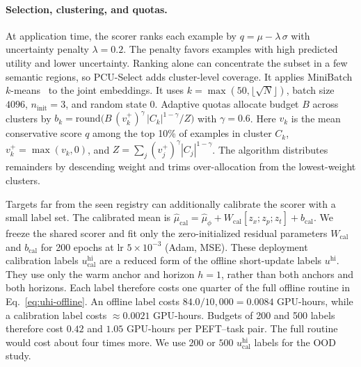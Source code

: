 \paragraph{Selection, clustering, and quotas.}
At application time, the scorer ranks each example by
$q = \mu - \lambda\,\sigma$ with uncertainty penalty $\lambda{=}0.2$. The
penalty favors examples with high predicted utility and lower uncertainty.
Ranking alone can concentrate the subset in a few semantic regions, so PCU-Select
adds cluster-level coverage. It applies MiniBatch
$k$-means~\cite{sculley2010minibatch} to the joint
embeddings. It uses $k = \max(50, \lfloor\sqrt{N}\rfloor)$, batch size $4096$,
$n_{\text{init}}{=}3$, and random state $0$. Adaptive quotas allocate budget $B$
across clusters by
$b_k = \mathrm{round}\!\big(B\, (v_k^+)^{\gamma}\, |C_k|^{1-\gamma} / Z\big)$ with
$\gamma{=}0.6$. Here $v_k$ is the mean conservative score $q$ among the top
10\% of examples in cluster $C_k$, $v_k^+=\max(v_k,0)$, and
$Z=\sum_j(v_j^+)^\gamma |C_j|^{1-\gamma}$. The algorithm distributes
remainders by descending weight and trims over-allocation from the
lowest-weight clusters.

Targets far from the seen registry can additionally calibrate the scorer with a
small label set. The calibrated mean is
$\widehat{\mu}_{\mathrm{cal}}=\widehat{\mu}_{\phi}
+W_{\mathrm{cal}}[z_x;z_p;z_t]+b_{\mathrm{cal}}$. We freeze the shared scorer
and fit only the zero-initialized residual parameters $W_{\mathrm{cal}}$ and
$b_{\mathrm{cal}}$ for 200 epochs at lr $5\times10^{-3}$ (Adam, MSE). These
deployment calibration labels $u^{\mathrm{hi}}_{\mathrm{cal}}$ are a reduced form of the
offline short-update labels $u^{\mathrm{hi}}$. They use only the warm anchor and
horizon $h{=}1$, rather than both anchors and both horizons. Each label therefore
costs one quarter of the full offline routine in
Eq.~\eqref{eq:uhi-offline}. An offline label costs
$84.0/10{,}000=0.0084$ GPU-hours, while a calibration label costs
$\approx0.0021$ GPU-hours. Budgets of 200 and 500 labels therefore cost $0.42$
and $1.05$ GPU-hours per PEFT--task pair. The full routine would cost about four
times more. We use $200$ or $500$
$u^{\mathrm{hi}}_{\mathrm{cal}}$ labels for the OOD study.

